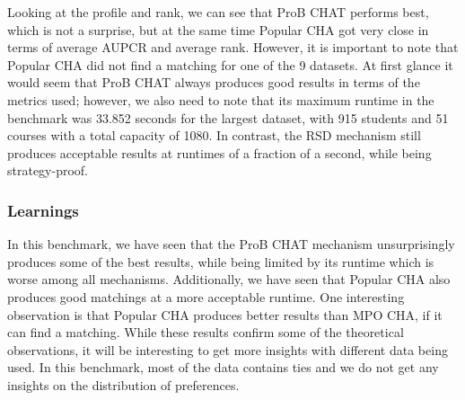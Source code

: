 Looking at the profile and rank, we can see that ProB CHAT performs best, which is not a surprise, but at the same time Popular CHA got very close in terms of average AUPCR and average rank. However, it is important to note that Popular CHA did not find a matching for one of the 9 datasets. At first glance it would seem that ProB CHAT always produces good results in terms of the metrics used; however, we also need to note that its maximum runtime in the benchmark was 33.852 seconds for the largest dataset, with 915 students and 51 courses with a total capacity of 1080. In contrast, the RSD mechanism still produces acceptable results at runtimes of a fraction of a second, while being strategy-proof.

\subsubsection{Learnings}
In this benchmark, we have seen that the ProB CHAT mechanism unsurprisingly produces some of the best results, while being limited by its runtime which is worse among all mechanisms. Additionally, we have seen that Popular CHA also produces good matchings at a more acceptable runtime. One interesting observation is that Popular CHA produces better results than MPO CHA, if it can find a matching. While these results confirm some of the theoretical observations, it will be interesting to get more insights with different data being used. In this benchmark, most of the data contains ties and we do not get any insights on the distribution of preferences. 